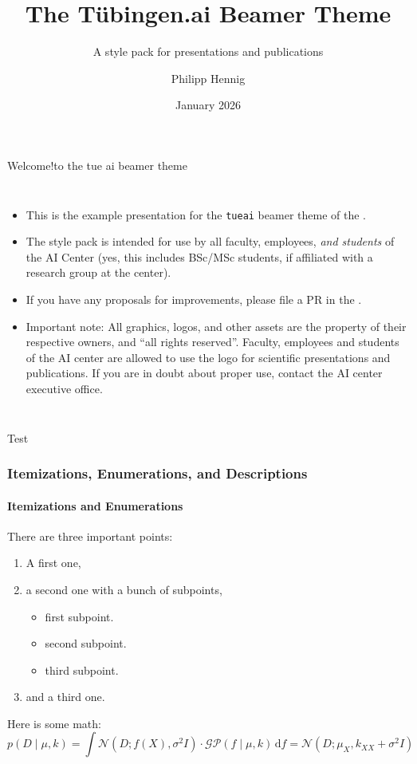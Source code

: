 \documentclass[10pt,aspectratio=169]{beamer}
\title[Tübingen.ai Beamer Theme]{The Tübingen.ai Beamer Theme}
\subtitle{A style pack for presentations and publications}
\author[P.~Hennig]{Philipp Hennig}
\institute{Tübingen AI Center, Tübingen, Germany}
\date{January 2026}
\begin{document}
\begin{frame}[plain]
    \titlepage
\end{frame}

\begin{frame}{Welcome!}{to the tue ai beamer theme}


    \begin{columns}
        \begin{itemize}
            \item This is the example presentation for the \texttt{tueai} beamer theme of the .
            \item The style pack is intended for use by all faculty, employees, \emph{and students} of the AI Center (yes, this includes BSc/MSc students, if affiliated with a research group at the center).
            \item If you have any proposals for improvements, please file a PR in the .
            \item \alert{Important note:} All graphics, logos, and other assets are the property of their respective owners, and ``all rights reserved''. Faculty, employees and students of the AI center are allowed to use the logo for scientific presentations and publications. If you are in doubt about proper use, contact the AI center executive office.
        \end{itemize}
    \end{columns}

\end{frame}


\begin{frame}{Test}
    \frametitle{Itemizations, Enumerations, and Descriptions}
    \framesubtitle{Itemizations and Enumerations}
    There are three \alert{important} points:
    \begin{enumerate}
        \item A first one,
        \item a second one with a bunch of subpoints,
              \begin{itemize}
                  \item first subpoint.
                  \item second subpoint.
                  \item third subpoint.
              \end{itemize}
        \item and a third one.
    \end{enumerate}
    Here is some math:
    \[ p(D\mid \mu,k) = \int \mathcal{N}(D; f(X), \sigma^2 I) \cdot \mathcal{GP}(f\mid \mu,k) \, \mathrm{d}f = \mathcal{N}(D; \mu_X, k_{XX} + \sigma^2 I) \]
\end{frame}
\end{document}
